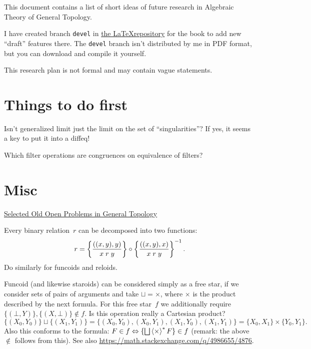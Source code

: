 \documentclass{amsart}
\begin{document}
This document contains a list of short ideas of future research in Algebraic
Theory of General Topology.

I have created branch \texttt{devel} in \href{https://bitbucket.org/portonv/algebraic-general-topology}{the \LaTeX repository} for the book
to add new ``draft'' features there. The \texttt{devel} branch isn't distributed by me in PDF format, but you can download and compile it yourself.

This research plan is not formal and may contain vague statements.

\section{Things to do first}

Isn't generalized limit just the limit on the set of ``singularities''? If yes, it seems a key to put it into a diffeq!

Which filter operations are congruences on
equivalence of filters?

\section{Misc}

\href{https://www.math.md/files/basm/y2013-n2-3/y2013-n2-3-(pp37-46).pdf.pdf}{Selected Old Open Problems in General Topology}{}

Every binary relation~$r$ can be decomposed into two functions:
\[r = \left\{ \frac{((x,y),y)}{x\mathrel{r}y}\right\}\circ\left\{ \frac{((x,y),x)}{x\mathrel{r}y}\right\}^{-1}.\]
Do similarly for funcoids and reloids.

Funcoid (and likewise staroids) can be considered simply as a free star, if we consider sets of pairs of arguments and take
${\sqcup}={\times}$, where $\times$ is the product described by the next formula. For this free star~$f$ we additionally
require $\{(\bot,Y)\},\{(X,\bot)\}\not\in f$. Is this operation really a Cartesian product?
$$\{(X_0,Y_0)\}\sqcup\{(X_1,Y_1)\} = \{(X_0,Y_0),(X_0,Y_1),(X_1,Y_0),(X_1,Y_1)\} = \{X_0,X_1\}\times\{Y_0,Y_1\}.$$
Also this conforms to the formula: $F\in f\Leftrightarrow\{\bigsqcup\rsupfun{\times}F\}\in f$
(remark: the above $\not\in$ follows from this).
See also \url{https://math.stackexchange.com/q/4986655/4876}.
\end{document}
